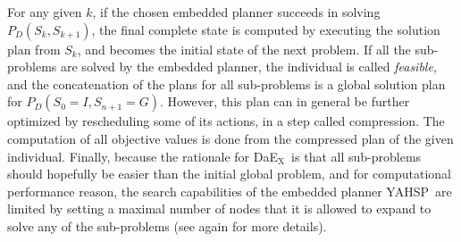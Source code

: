 \documentclass{llncs}
\def\DAEX{{\sc DaE$_{\text{X}}$}}
\def\YAHSP{{\sc YAHSP}}
\begin{document}
For any given $k$, if the chosen embedded planner succeeds in solving $ P_{D} (S_k, S_{k+1} )$, the final complete state is computed by executing the solution plan
from $S_k$, and becomes the initial state of the next problem. If all the sub-problems are solved by the  embedded planner, 
the individual is called \textit{feasible}, and the concatenation of the plans for all sub-problems  is a
global solution plan for $P_{D} (S_{0} = I, S_{n+1} = G)$. However, this plan can in general be further optimized by rescheduling some of its actions, in a step called
compression. The computation of all objective values is done from the compressed plan of the given individual.
Finally, because the rationale for \DAEX\ is that all sub-problems should hopefully be easier than the initial global problem, and for computational performance reason, the search capabilities of the embedded planner \YAHSP\ are limited by setting a maximal number of nodes that it is allowed to expand to solve any of the sub-problems (see again \cite{Bibai2010} for more details).
 
\end{document}
